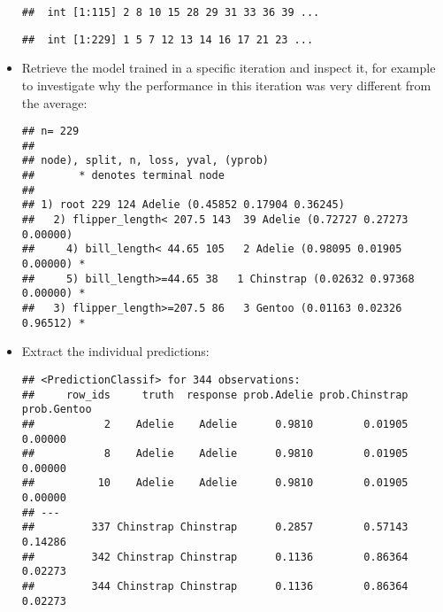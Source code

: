 \documentclass[
]{scrbook}
\newenvironment{Shaded}{\begin{snugshade}}{\end{snugshade}}
\newcommand{\CommentTok}[1]{\textcolor[rgb]{0.56,0.35,0.01}{\textit{#1}}}
\newcommand{\DecValTok}[1]{\textcolor[rgb]{0.00,0.00,0.81}{#1}}
\newcommand{\FunctionTok}[1]{\textcolor[rgb]{0.00,0.00,0.00}{#1}}
\newcommand{\NormalTok}[1]{#1}
\newcommand{\OtherTok}[1]{\textcolor[rgb]{0.56,0.35,0.01}{#1}}
\newcommand{\SpecialCharTok}[1]{\textcolor[rgb]{0.00,0.00,0.00}{#1}}
\renewenvironment{Shaded} {\begin{snugshade}\small} {\end{snugshade}}
\begin{document}
\begin{itemize}
\begin{verbatim}
##  int [1:115] 2 8 10 15 28 29 31 33 36 39 ...
\end{verbatim}

\begin{Shaded}
\end{Shaded}

\begin{verbatim}
##  int [1:229] 1 5 7 12 13 14 16 17 21 23 ...
\end{verbatim}
\item
  Retrieve the model trained in a specific iteration and inspect it, for example to investigate why the performance in this iteration was very different from the average:

\begin{Shaded}
\end{Shaded}

\begin{verbatim}
## n= 229 
## 
## node), split, n, loss, yval, (yprob)
##       * denotes terminal node
## 
## 1) root 229 124 Adelie (0.45852 0.17904 0.36245)  
##   2) flipper_length< 207.5 143  39 Adelie (0.72727 0.27273 0.00000)  
##     4) bill_length< 44.65 105   2 Adelie (0.98095 0.01905 0.00000) *
##     5) bill_length>=44.65 38   1 Chinstrap (0.02632 0.97368 0.00000) *
##   3) flipper_length>=207.5 86   3 Gentoo (0.01163 0.02326 0.96512) *
\end{verbatim}
\item
  Extract the individual predictions:

\begin{Shaded}
\end{Shaded}

\begin{verbatim}
## <PredictionClassif> for 344 observations:
##     row_ids     truth  response prob.Adelie prob.Chinstrap prob.Gentoo
##           2    Adelie    Adelie      0.9810        0.01905     0.00000
##           8    Adelie    Adelie      0.9810        0.01905     0.00000
##          10    Adelie    Adelie      0.9810        0.01905     0.00000
## ---                                                                   
##         337 Chinstrap Chinstrap      0.2857        0.57143     0.14286
##         342 Chinstrap Chinstrap      0.1136        0.86364     0.02273
##         344 Chinstrap Chinstrap      0.1136        0.86364     0.02273
\end{verbatim}


\end{itemize}
\end{document}
